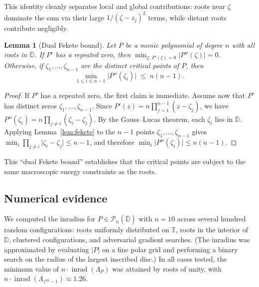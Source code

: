 \documentclass[11pt,a4paper]{amsart}
\newtheorem{lemma}[theorem]{Lemma}
\theoremstyle{definition}
\newcommand{\D}{\mathbb{D}}
\newcommand{\T}{\mathbb{T}}
\newcommand{\Pn}{\mathcal{P}_n}
\newcommand{\abs}[1]{\lvert #1 \rvert}
\newcommand{\inrad}{\operatorname{inrad}}
\begin{document}
This identity cleanly separates local and global contributions:
roots near $\zeta$ dominate the sum via their large $1/(\zeta-z_j)^2$
terms, while distant roots contribute negligibly.

\begin{lemma}[Dual Fekete bound]\label{lem:dual-fekete}
Let $P$ be a monic polynomial of degree $n$ with all roots in
$\overline{\D}$.  If $P'$ has a repeated zero, then
$\min_{\zeta:\,P'(\zeta)=0}\abs{P''(\zeta)} = 0$.
Otherwise, if $\zeta_1, \ldots, \zeta_{n-1}$ are the distinct
critical points of $P$, then
\begin{equation}\label{eq:dual-fekete}
  \min_{1 \leq i \leq n-1} \abs{P''(\zeta_i)} \;\leq\; n(n-1).
\end{equation}
\end{lemma}

\begin{proof}
If $P'$ has a repeated zero, the first claim is immediate.
Assume now that $P'$ has distinct zeros $\zeta_1, \ldots, \zeta_{n-1}$.
Since $P'(z) = n\prod_{j=1}^{n-1}(z - \zeta_j)$, we have
$P''(\zeta_i) = n\prod_{j \neq i}(\zeta_i - \zeta_j)$.
By the Gauss--Lucas theorem, each $\zeta_i$ lies in $\overline{\D}$.
Applying Lemma~\ref{lem:fekete} to the $n-1$ points
$\zeta_1, \ldots, \zeta_{n-1}$ gives
$\min_i \prod_{j \neq i}\abs{\zeta_i - \zeta_j} \leq n-1$,
and therefore $\min_i \abs{P''(\zeta_i)} \leq n(n-1)$.
\end{proof}

This ``dual Fekete bound'' establishes that the critical points are
subject to the same macroscopic energy constraints as the roots.

\subsection{Numerical evidence}
\label{sec:numerics}

We computed the inradius for
$P \in \Pn(\overline{\D})$ with $n = 10$ across several
hundred random configurations: roots uniformly distributed on $\T$,
roots in the interior of $\D$, clustered configurations, and
adversarial gradient searches.  (The inradius was approximated by
evaluating $\abs{P}$ on a fine polar grid and performing a binary search
on the radius of the largest inscribed disc.)
In all cases tested, the minimum value of
$n \cdot \inrad(\Lambda_P)$ was attained by roots of unity,
with $n \cdot \inrad(\Lambda_{z^{10}-1}) \approx 1.26$.
\end{document}
